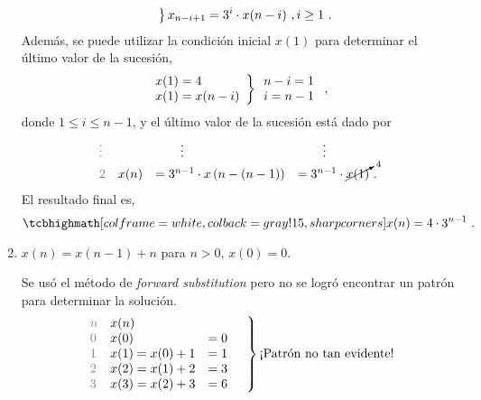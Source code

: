 \begin{enumerate}[label=\textbf{\alph*.}]
\begin{solution}
\begin{equation*}
\begin{rcases}
\begin{array}{l l l l}
                \end{array} \quad
            \end{rcases}
            x_{n - i + 1} = \dprod{3^i}{x(n - i)}\ , i \geq 1\ .
        \end{equation*}
        Además, se puede utilizar la condición inicial $x(1)$ para determinar el último valor de la sucesión,
        \begin{equation*}
            \begin{rcases}
                \begin{array}{l}
                    x(1) = 4 \\
                    x(1) = x(n - i)
                \end{array}
            \end{rcases}
            \begin{array}{l}
                n - i = 1 \\
                i = n - 1
            \end{array}\ ,
        \end{equation*}
        donde $1 \leq i \leq n - 1$, y el último valor de la sucesión está dado por
        \begin{equation*}
            \begin{array}{l l l l}
                \txtgray\vdots & & \qquad\vdots & \qquad\vdots \\
                \txtgray{2} & x(n) & = \dprod{3^{n - 1}}{x\left(n - (n - 1)\right)} & = \dprod{3^{n - 1}}{\cancelto{4}{x(1)}}\ .
            \end{array}
        \end{equation*}
        El resultado final es,
        \begin{equation}
            \result{x(n) = \dprod{4}{3^{n - 1}}\ .}
        \end{equation}
    \end{solution}

    \item $x(n) = x(n-1) + n$ para $n > 0$, $x(0) = 0$.
    \begin{solution}
        Se usó el método de \textit{forward substitution} pero no se logró encontrar un patrón para determinar la solución.
        \begin{equation*}
            \begin{rcases}
                \begin{array}{l l l}
                    \txtgray{n} & x(n) & \\
                    \txtgray{0} & x(0) & = 0 \\
                    \txtgray{1} & x(1) = x(0) + 1 & = 1 \\
                    \txtgray{2} & x(2) = x(1) + 2 & = 3 \\
                    \txtgray{3} & x(3) = x(2) + 3 & = 6
                \end{array} \quad
            \end{rcases}
            \text{¡Patrón no tan evidente!}
        \end{equation*}


\end{solution}
\end{enumerate}
